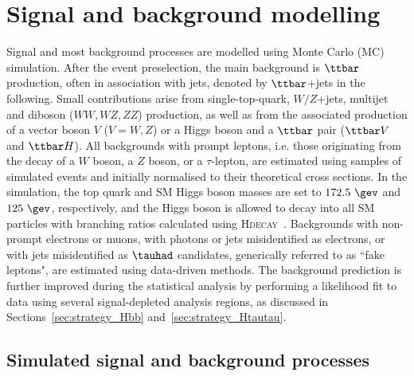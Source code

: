 \section{Signal and background modelling}
\label{sec:signal_background_model}

Signal and most background processes are modelled using Monte Carlo (MC) simulation.
After the event preselection, the main background is $\ttbar$ production, often in association with jets, denoted by $\ttbar$+jets in the following.
Small contributions arise from single-top-quark, $W/Z$+jets, multijet and diboson ($WW,WZ,ZZ$) production, as well as from the associated 
production of a vector boson $V$ ($V=W,Z$) or a Higgs boson and a $\ttbar$ pair ($\ttbar V$ and $\ttbar H$). All backgrounds 
with prompt leptons, i.e. those originating from the decay of a $W$ boson, a $Z$ boson, or a $\tau$-lepton,
are estimated using samples of simulated events and initially normalised to their theoretical cross sections.
In the simulation, the top quark and SM Higgs boson masses are set to $172.5~\gev$ and $125~\gev$, respectively,
and the Higgs boson is allowed to decay into all SM particles with branching ratios calculated using \textsc{Hdecay}~\cite{Djouadi:1997yw}.  
Backgrounds with non-prompt electrons or muons, with photons or jets misidentified as electrons, or with jets misidentified as $\tauhad$ candidates, 
generically referred to as ``fake leptons", are estimated using data-driven methods. 
The background prediction is further improved during the statistical analysis by performing a likelihood 
fit to data using several signal-depleted analysis regions, as discussed in Sections~\ref{sec:strategy_Hbb} and~\ref{sec:strategy_Htautau}.

\subsection{Simulated signal and background processes}
\label{sec:simulations}

